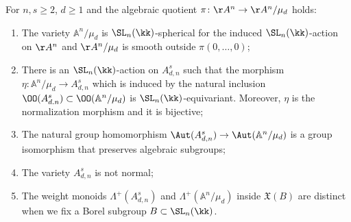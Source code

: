 \begin{proposition}
\label{prop.ex_normality}
For $n, s \geq 2$, $d \geq 1$ and the algebraic quotient $\pi \colon \AA^n \to \AA^n / \mu_d$ holds:
\begin{enumerate}
\item \label{prop.ex_normality1}
The variety
$\mathbb{A}^n/\mu_d$ is $\SL_n(\kk)$-spherical for the induced $\SL_n(\kk)$-action
on $\AA^n$ and $\AA^n / \mu_d$ is smooth outside $\pi(0, \ldots, 0)$;
\item \label{prop.ex_normality2}
There is an $\SL_n(\kk)$-action on $A_{d, n}^s$ such that the morphism $\eta \colon \mathbb{A}^n/\mu_d \to A_{d, n}^s$ which is induced by the natural
inclusion $\OO(A_{d. n}^s) \subset \OO(\mathbb{A}^n/\mu_d)$ is
$\SL_n(\kk)$-equivariant. Moreover, $\eta$ is the normalization morphism and it is bijective;
\item \label{prop.ex_normality3}
The natural group homomorphism $\Aut(A_{d, n}^s) \to \Aut(\mathbb{A}^n/\mu_d)$
is a group isomorphism that preserves algebraic subgroups;
\item \label{prop.ex_normality4}
The variety $A_{d, n}^s$ is not normal;
\item \label{prop.ex_normality5}
The weight monoids $\Lambda^+(A_{d, n}^s)$ and $\Lambda^+(\mathbb{A}^n/\mu_d)$ inside $\mathfrak{X}(B)$ are distinct when we fix
a Borel subgroup $B \subset \SL_n(\kk)$.
\end{enumerate}
\end{proposition}

